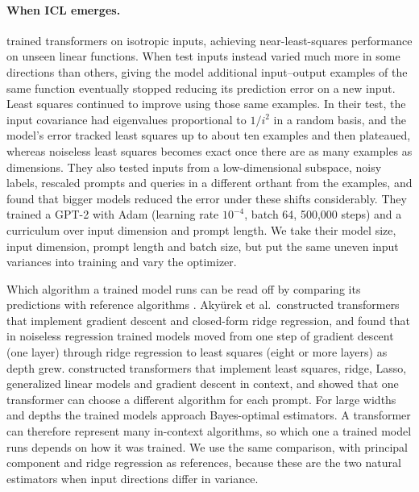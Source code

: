 \paragraph{When ICL emerges.} \citet{garg2022} trained transformers on isotropic inputs, achieving near-least-squares performance on unseen linear functions. When test inputs instead varied much more in some directions than others, giving the model additional input--output examples of the same function eventually stopped reducing its prediction error on a new input. Least squares continued to improve using those same examples. In their test, the input covariance had eigenvalues proportional to $1/i^2$ in a random basis, and the model's error tracked least squares up to about ten examples and then plateaued, whereas noiseless least squares becomes exact once there are as many examples as dimensions. They also tested inputs from a low-dimensional subspace, noisy labels, rescaled prompts and queries in a different orthant from the examples, and found that bigger models reduced the error under these shifts considerably. They trained a GPT-2 \citep{radford2019gpt2} with Adam (learning rate $10^{-4}$, batch 64, 500,000 steps) and a curriculum over input dimension and prompt length. We take their model size, input dimension, prompt length and batch size, but put the same uneven input variances into training and vary the optimizer.

Which algorithm a trained model runs can be read off by comparing its predictions with reference algorithms \citep{akyurek2023}. Akyürek et al.\ constructed transformers that implement gradient descent and closed-form ridge regression, and found that in noiseless regression trained models moved from one step of gradient descent (one layer) through ridge regression to least squares (eight or more layers) as depth grew. \citet{bai2023} constructed transformers that implement least squares, ridge, Lasso, generalized linear models and gradient descent in context, and showed that one transformer can choose a different algorithm for each prompt. For large widths and depths the trained models approach Bayes-optimal estimators. A transformer can therefore represent many in-context algorithms, so which one a trained model runs depends on how it was trained. We use the same comparison, with principal component and ridge regression as references, because these are the two natural estimators when input directions differ in variance.

